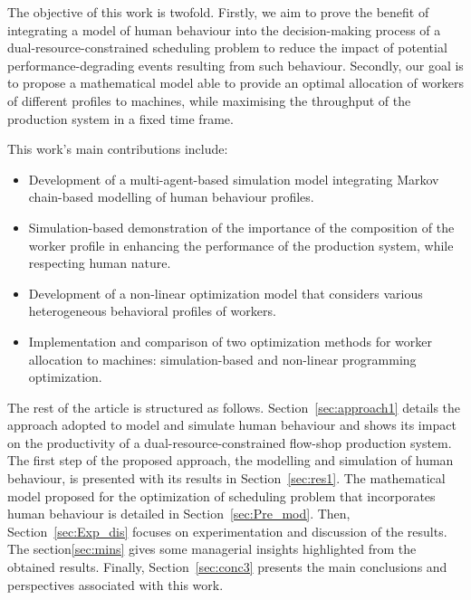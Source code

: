 \documentclass[review,12pt, 3p, times]{elsarticle}
\begin{document}
The objective of this work is twofold. Firstly, we aim to prove the benefit of integrating a model of human behaviour into the decision-making process of a dual-resource-constrained scheduling problem to reduce the impact of potential performance-degrading events resulting from such behaviour. Secondly, our goal is to propose a mathematical model able to provide an optimal allocation of workers of different profiles to machines, while maximising the throughput of the production system in a fixed time frame.

	
This work's main contributions include: 
\begin{itemize}
	\item Development of a multi-agent-based simulation model integrating Markov chain-based modelling of human behaviour profiles. 
	\item Simulation-based demonstration of the importance of the composition of the worker profile in enhancing the performance of the production system, while respecting human nature. 
	\item Development of a non-linear optimization model that considers various heterogeneous behavioral profiles of workers.  
	\item Implementation and comparison of two optimization methods for worker allocation to machines: simulation-based and non-linear programming optimization. 
\end{itemize}

The rest of the article is structured as follows. Section~\ref{sec:approach1} details the approach adopted to model and simulate human behaviour and shows its impact on the productivity of a dual-resource-constrained flow-shop production system. The first step of the proposed approach, the modelling and simulation of human behaviour, is presented with its results in Section~\ref{sec:res1}. The mathematical model proposed for the optimization of scheduling problem that incorporates human behaviour is detailed in Section~\ref{sec:Pre_mod}. Then, Section~\ref{sec:Exp_dis} focuses on experimentation and discussion of the results. The section\ref{sec:mins} gives some managerial insights highlighted from the obtained results. Finally, Section~\ref{sec:conc3} presents the main conclusions and perspectives associated with this work.
	
\end{document}
